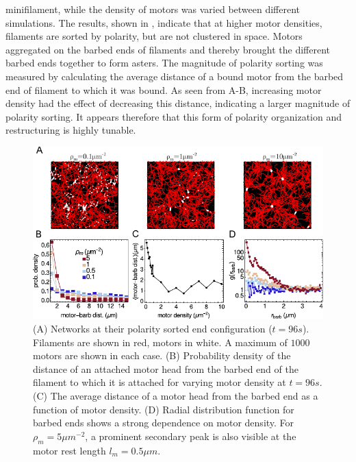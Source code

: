 \documentclass[12pt]{article}
\begin{document}
minifilament, while the density of motors was varied between different
simulations. The results, shown in , indicate that at
higher motor densities, filaments are sorted by polarity, but are 
not clustered in space. Motors aggregated on the barbed ends of filaments
and thereby brought the different barbed ends together to form asters.
The magnitude of polarity sorting was measured by calculating the average 
distance of a bound motor from the barbed end of filament to which it was bound.
As seen from A-B, increasing motor density had the
effect of decreasing this distance, indicating a larger magnitude of polarity
sorting. It appears therefore that this form of polarity organization and
restructuring is highly tunable. 
\begin{figure}[H] 
\centering
    \includegraphics[scale=1.2] {figs/polarity_sorting/ps_fig.pdf}
  \caption{%
  \label{fig:polarity_sorting}%
  (A) Networks at their polarity sorted end configuration ($t=96s$). 
  Filaments are shown in red, motors in white. A maximum of $1000$ motors are
  shown in each case.
 (B) Probability density of the distance of an attached motor
   head from the barbed end of the filament to which it is attached for varying
   motor density at $t=96s$.
 (C) The average distance of a motor head from the barbed end as a function of
 motor density.
 (D) Radial distribution function for barbed ends shows a strong dependence on
 motor density. For $\rho_m=5\mu m^{-2}$, a prominent secondary peak is also
 visible at the motor rest length $l_m=0.5\mu m$.
 } 
 \end{figure}
\end{document}
